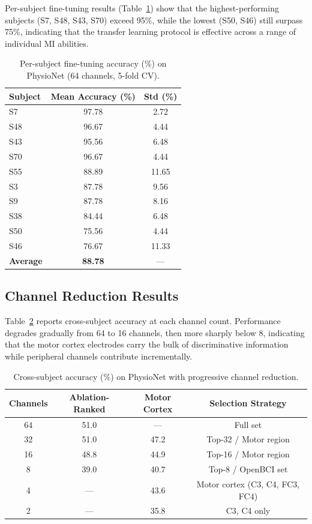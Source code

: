 \documentclass[12pt, a4paper]{article}
\begin{document}
Per-subject fine-tuning results (Table~\ref{tab:finetune_detail}) show that the highest-performing subjects (S7, S48, S43, S70) exceed 95\%, while the lowest (S50, S46) still surpass 75\%, indicating that the transfer learning protocol is effective across a range of individual MI abilities.

\begin{table}[htbp]
\centering
\caption{Per-subject fine-tuning accuracy (\%) on PhysioNet (64 channels, 5-fold CV).}
\label{tab:finetune_detail}
\begin{tabular}{lcc}
\toprule
\textbf{Subject} & \textbf{Mean Accuracy (\%)} & \textbf{Std (\%)} \\
\midrule
S7  & 97.78 & 2.72 \\
S48 & 96.67 & 4.44 \\
S43 & 95.56 & 6.48 \\
S70 & 96.67 & 4.44 \\
S55 & 88.89 & 11.65 \\
S3  & 87.78 & 9.56 \\
S9  & 87.78 & 8.16 \\
S38 & 84.44 & 6.48 \\
S50 & 75.56 & 4.44 \\
S46 & 76.67 & 11.33 \\
\midrule
\textbf{Average} & \textbf{88.78} & --- \\
\bottomrule
\end{tabular}
\end{table}

\subsection{Channel Reduction Results}

Table~\ref{tab:channel_reduction} reports cross-subject accuracy at each channel count. Performance degrades gradually from 64 to 16 channels, then more sharply below 8, indicating that the motor cortex electrodes carry the bulk of discriminative information while peripheral channels contribute incrementally.

\begin{table}[htbp]
\centering
\caption{Cross-subject accuracy (\%) on PhysioNet with progressive channel reduction.}
\label{tab:channel_reduction}
\begin{tabular}{cccc}
\toprule
\textbf{Channels} & \textbf{Ablation-Ranked} & \textbf{Motor Cortex} & \textbf{Selection Strategy} \\
\midrule
64 & 51.0 & --- & Full set \\
32 & 51.0 & 47.2 & Top-32 / Motor region \\
16 & 48.8 & 44.9 & Top-16 / Motor region \\
8  & 39.0 & 40.7 & Top-8 / OpenBCI set \\
4  & --- & 43.6 & Motor cortex (C3, C4, FC3, FC4) \\
2  & --- & 35.8 & C3, C4 only \\
\bottomrule
\end{tabular}
\end{table}
\end{document}
